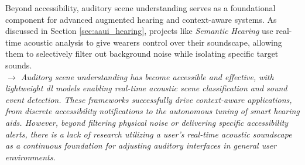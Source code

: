 Beyond accessibility, auditory scene understanding serves as a foundational component for advanced augmented hearing and context-aware systems. As discussed in Section \ref{sec:aaui_hearing}, projects like \textit{Semantic Hearing} \cite{Veluri_23_SemanticHearing} use real-time acoustic analysis to give wearers control over their soundscape, allowing them to selectively filter out background noise while isolating specific target sounds.
\\

\textit{$\rightarrow$ Auditory scene understanding has become accessible and effective, with lightweight \gls{dl} models enabling real-time acoustic scene classification and sound event detection. These frameworks successfully drive context-aware applications, from discrete accessibility notifications to the autonomous tuning of smart hearing aids. However, beyond filtering physical noise or delivering specific accessibility alerts, there is a lack of research utilizing a user’s real-time acoustic soundscape as a continuous foundation for adjusting auditory interfaces in general user environments.}

